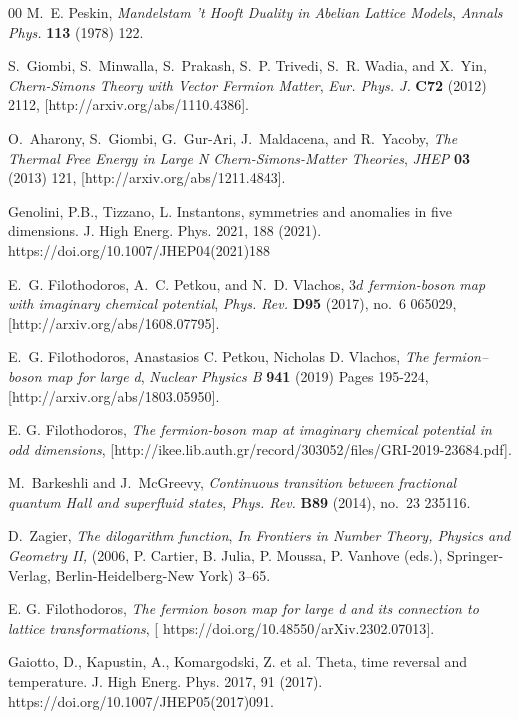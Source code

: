 \documentclass[twoside]{article}
\begin{document}
\begin{thebibliography}{00}
M.~E. Peskin, {\it {Mandelstam 't Hooft Duality in Abelian Lattice Models}},
  {\em Annals Phys.} {\bf 113} (1978) 122.

S.~Giombi, S.~Minwalla, S.~Prakash, S.~P. Trivedi, S.~R. Wadia, and X.~Yin,
  {\it {Chern-Simons Theory with Vector Fermion Matter}}, {\em Eur. Phys. J.}
  {\bf C72} (2012) 2112, [{http://arxiv.org/abs/1110.4386}].

O.~Aharony, S.~Giombi, G.~Gur-Ari, J.~Maldacena, and R.~Yacoby, {\it {The
  Thermal Free Energy in Large N Chern-Simons-Matter Theories}},  {\em JHEP}
  {\bf 03} (2013) 121, [{http://arxiv.org/abs/1211.4843}].
  
Genolini, P.B., Tizzano, L. Instantons, symmetries and anomalies in five dimensions. J. High Energ. Phys. 2021, 188 (2021). https://doi.org/10.1007/JHEP04(2021)188

E.~G. Filothodoros, A.~C. Petkou, and N.~D. Vlachos, {\it {$3d$ fermion-boson map with imaginary chemical potential}}, {\em Phys. Rev.} {\bf D95} (2017),
  no.~6 065029, [{http://arxiv.org/abs/1608.07795}].

E.~G. Filothodoros, Anastasios C. Petkou, Nicholas D. Vlachos,
{\it {The fermion–boson map for large d}},
{\em Nuclear Physics B}
{\bf 941} (2019) Pages 195-224,[{http://arxiv.org/abs/1803.05950}].

E. G. Filothodoros, {\it {The fermion-boson map at imaginary chemical potential in odd dimensions}}, [{http://ikee.lib.auth.gr/record/303052/files/GRI-2019-23684.pdf}].

M.~Barkeshli and J.~McGreevy, {\it {Continuous transition between fractional
  quantum Hall and superfluid states}}, {\em Phys. Rev.} {\bf B89} (2014),
  no.~23 235116.

D.~Zagier, {\it The dilogarithm function}, {\em In Frontiers in Number Theory,
  Physics and Geometry II,} (2006, P. Cartier, B. Julia, P. Moussa, P. Vanhove
  (eds.), Springer-Verlag, Berlin-Heidelberg-New York) 3--65.

E. G. Filothodoros, {\it {The fermion boson map for large d and its connection to lattice transformations}}, [{
https://doi.org/10.48550/arXiv.2302.07013}].

Gaiotto, D., Kapustin, A., Komargodski, Z. et al. Theta, time reversal and temperature. J. High Energ. Phys. 2017, 91 (2017). https://doi.org/10.1007/JHEP05(2017)091.


\end{thebibliography}
\end{document}
